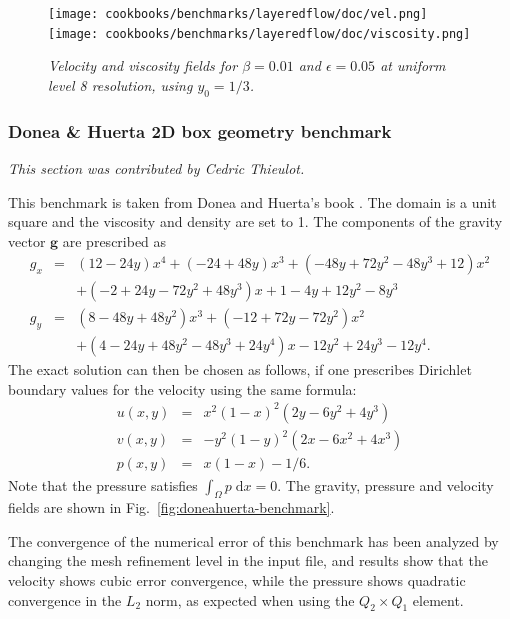 \documentclass{article}
\begin{document}
\begin{figure}
\begin{center}
  \centering
  \texttt{[image: cookbooks/benchmarks/layeredflow/doc/vel.png]}
  \texttt{[image: cookbooks/benchmarks/layeredflow/doc/viscosity.png]}
  \caption{\it Velocity and viscosity fields for $\beta=0.01$ and
    $\epsilon=0.05$ at uniform level 8 resolution, using $y_0=1/3$.}
  \label{fig:layeredflow2}
\end{center}
\end{figure}









\subsubsection{Donea \& Huerta 2D box geometry benchmark}
\label{sec:benchmark-donea-huerta}

\textit{This section was contributed by Cedric Thieulot.}

This benchmark is taken from Donea and Huerta's book \cite{DH03book}.
The domain is a unit square and the viscosity and density are set to 1.
The components of the gravity vector $\mathbf g$ are prescribed as
\begin{eqnarray}
g_x &=& (12 - 24y) x^4 + (-24 + 48y) x^3 + (-48y + 72y^2 - 48 y^3 + 12) x^2 \nonumber\\
    && + (-2 + 24y -72y^2+48y^3)x + 1-4y + 12y^2-8y^3 \nonumber\\
g_y &=& (8 - 48y + 48 y^2) x^3 + (-12 + 72y - 72y^2) x^2  \nonumber\\
    && + (4 - 24y + 48y^2 - 48y^3 + 24y^4) x - 12y^2 + 24y^3 - 12y^4.
\end{eqnarray}
The exact solution can then be chosen as follows, if one prescribes Dirichlet boundary
values for the velocity using the same formula:
\begin{eqnarray}
u(x,y) &=& x^2(1- x)^2 (2y - 6y^2 + 4y^3)  \nonumber\\
v(x,y) &=& -y^2 (1 - y)^2 (2x - 6x^2 + 4x^3) \nonumber\\
p(x,y) &=& x(1 -x) -1/6.
\end{eqnarray}
Note that the pressure satisfies $\int_{\Omega} p \; \text{d}x = 0$.
The gravity, pressure and velocity fields are shown in Fig.~\ref{fig:doneahuerta-benchmark}.

The convergence of the numerical error of this benchmark has been analyzed by
changing the mesh refinement level in the input file, and
results show that the velocity shows cubic error
convergence, while the pressure shows quadratic convergence in the
$L_2$ norm, as expected when using the $Q_2\times Q_1$ element.
\end{document}
